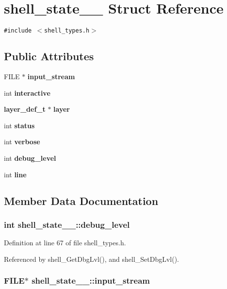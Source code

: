 \section{shell\_\-state\_\-\_\- Struct Reference}
\label{structshell__state____}
{\tt \#include $<$shell\_\-types.h$>$}

\subsection*{Public Attributes}
\begin{CompactItemize}
\item 
FILE $\ast$ {\bf input\_\-stream}
\item 
int {\bf interactive}
\item 
{\bf layer\_\-def\_\-t} $\ast$ {\bf layer}
\item 
int {\bf status}
\item 
int {\bf verbose}
\item 
int {\bf debug\_\-level}
\item 
int {\bf line}
\end{CompactItemize}


\subsection{Member Data Documentation}
\subsubsection{\setlength{\rightskip}{0pt plus 5cm}int {\bf shell\_\-state\_\-\_\-::debug\_\-level}}\label{structshell__state_____o5}




Definition at line 67 of file shell\_\-types.h.

Referenced by shell\_\-Get\-Dbg\-Lvl(), and shell\_\-Set\-Dbg\-Lvl().
\subsubsection{\setlength{\rightskip}{0pt plus 5cm}FILE$\ast$ {\bf shell\_\-state\_\-\_\-::input\_\-stream}}\label{structshell__state_____o0}




